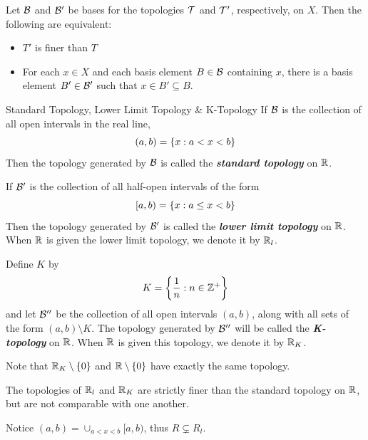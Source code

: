 \documentclass[12pt,a4paper]{article}
\begin{document}
    \begin{lemma}
        Let $\mathcal{B}$ and $\mathcal{B}'$ be bases for the topologies $\mathcal{T}$ and $\mathcal{T}'$, respectively, on $X$. Then the following are equivalent:
        \begin{itemize}
            \item $T'$ is finer than $T$
            \item For each $x\in X$ and each basis element $B\in\mathcal{B}$ containing $x$, there is a basis element $B'\in\mathcal{B}'$ such that $x\in B'\subseteq B$.
        \end{itemize}
    \end{lemma}
    \hfill

    \begin{defi}{Standard Topology, Lower Limit Topology \& K-Topology}
        If $\mathcal{B}$ is the collection of all open intervals in the real line,
        $$
        (a,b)=\left\{x:a<x<b\right\}
        $$
        Then the topology generated by $\mathcal{B}$ is called the \textbf{\textit{standard topology}} on $\mathbb{R}$.
        \vspace{1em}

        If $\mathcal{B}'$ is the collection of all half-open intervals of the form
        $$
        [a,b)=\left\{x:a\leq x<b\right\}
        $$
        Then the topology generated by $\mathcal{B}'$ is called the \textbf{\textit{lower limit topology}} on $\mathbb{R}$. When $\mathbb{R}$ is given the lower limit topology, we denote it by $\mathbb{R}_l$.
        \vspace{1em}

        Define $K$ by
        $$
        K=\left\{\frac{1}{n}:n\in\mathbb{Z}^+\right\}
        $$
        and let $\mathcal{B}''$ be the collection of all open intervals $(a,b)$, along with all sets of the form $(a,b)\setminus K$. The topology generated by $\mathcal{B}''$ will be called the \textbf{\textit{K-topology}} on $\mathbb{R}$. When $\mathbb{R}$ is given this topology, we denote it by $\mathbb{R}_K$.
    \end{defi}
    \begin{remark}
        Note that $\mathbb{R}_K\setminus\left\{0\right\}$ and $\mathbb{R}\setminus\left\{0\right\}$ have exactly the same topology.
    \end{remark}
    \hfill

    \begin{lemma}
        The topologies of $\mathbb{R}_l$ and $\mathbb{R}_K$ are strictly finer than the standard topology on $\mathbb{R}$, but are not comparable with one another.   
    \end{lemma}
    \begin{remark}
        Notice $(a,b)=\cup_{a<x<b}[a,b)$, thus $R\subsetneq R_l$.
    \end{remark}
    \hfill
\end{document}
